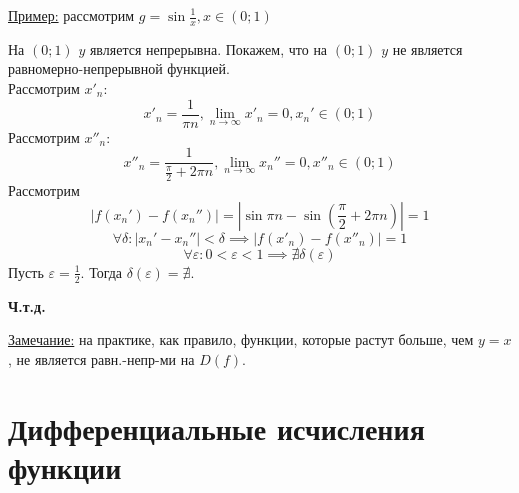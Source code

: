 \documentclass[12pt]{article}
\begin{document}
    \underline{Пример:} рассмотрим $g = \sin \frac{1}{x}, x \in (0; 1)$
    \begin{adjustwidth}{1.5em}{1.5em}
        На $(0; 1)$ $y$ является непрерывна. Покажем, что на $(0; 1)$ $y$ не является равномерно-непрерывной функцией.\\
        Рассмотрим $x'_n$:
        \[x'_n = \frac{1}{\pi n}, \lim_{n\to\infty} x'_n = 0, x_n' \in (0; 1)\]
        Рассмотрим $x''_n$: 
        \[x''_n = \frac{1}{\frac{\pi}{2}+2\pi n}, \lim_{n\to\infty}x_n'' = 0, x''_n \in (0; 1)\]
        Рассмотрим 
        \[|f(x_n') - f(x_n'')| = |\sin \pi n - \sin (\frac{\pi}{2} + 2\pi n)| = 1\]
        \[ \forall \delta : |x_n' - x_n''| < \delta \implies |f(x'_n) - f(x''_n)| = 1 \]
        \[ \forall \varepsilon : 0 < \varepsilon < 1 \implies \nexists \delta(\varepsilon) \]
        Пусть $\varepsilon = \frac{1}{2}$. Тогда $\delta(\varepsilon) = \nexists$.
        \begin{center}
            \textbf{Ч.т.д.}
        \end{center}
    \end{adjustwidth}
    \underline{Замечание:} на практике, как правило, функции, которые растут больше, чем $y=x$, не является равн.-непр-ми на $D(f)$.

    \section{Дифференциальные исчисления функции}
\end{document}
